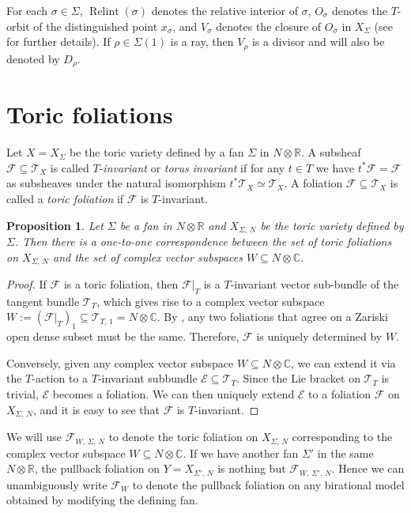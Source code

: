 \documentclass[12pt,reqno]{amsart}
\newtheorem{proposition}[theorem]{Proposition}
\theoremstyle{definition}
\newcommand{\mc}{\mathcal}
\newcommand{\on}{\operatorname}
\newcommand\cE{{\mathcal{E}}}
\newcommand\cF{{\mathcal{F}}}
\newcommand\cT{{\mathcal{T}}}
\newcommand\bC{{\mathbb C}}
\newcommand\bR{{\mathbb R}}
\begin{document}
For each $\sigma\in\Sigma$, $\on{Relint}(\sigma)$ denotes the relative interior of $\sigma$, $O_\sigma$ denotes the $T$-orbit of the distinguished point $x_\sigma$, and $V_\sigma$ denotes the closure of $O_\sigma$ in $X_\Sigma$ (see \cite[Chapter 3]{CLS11} for further details). 
If $\rho\in\Sigma(1)$ is a ray, then $V_\rho$ is a divisor and will also be denoted by $D_\rho$. 


\section{Toric foliations}\label{sec:toric_fol} 
Let $X=X_\Sigma$ be the toric variety defined by a fan $\Sigma$ in $N\otimes\bR$. 
A subsheaf $\cF\subseteq \cT_X$ is called $T$-\emph{invariant} or \emph{torus invariant} if for any $t\in T$ we have $t^*\mc F=\mc F$ as subsheaves under the natural isomorphism $t^*\cT_X\simeq \cT_X$. 
A foliation $\cF\subseteq \cT_X$ is called a \emph{toric foliation} if $\cF$ is $T$-invariant. 

\begin{proposition}\label{1-1}
Let $\Sigma$ be a fan in $N\otimes\bR$ and $X_{\Sigma,\,N}$ be the toric variety defined by $\Sigma$. 
Then there is a one-to-one correspondence between the set of toric foliations on $X_{\Sigma,\,N}$ and the set of complex vector subspaces $W\subseteq N\otimes\bC$. 
\end{proposition} 
\begin{proof}
    If $\cF$ is a toric foliation, then $\cF\vert_T$ is a $T$-invariant vector sub-bundle of the tangent bundle $\cT_T$, which gives rise to a complex vector subspace $W:=(\cF\vert_T)_{1}\subseteq \cT_{T,\,1}=N\otimes\bC$. 
    By \cite[Lemma 1.8]{hacon2021birational}, any two foliations that agree on a Zariski open dense subset must be the same.
    Therefore, $\cF$ is uniquely determined by $W$. 
    
    Conversely, given any complex vector subspace $W\subseteq N\otimes\bC$, we can extend it via the $T$-action to a $T$-invariant subbundle $\cE\subseteq \cT_T$. 
    Since the Lie bracket on $\cT_{T}$ is trivial, $\cE$ becomes a foliation.  
    We can then uniquely extend $\cE$ to a foliation $\cF$ on $X_{\Sigma,\,N}$, and it is easy to see that $\mc F$ is $T$-invariant. 
\end{proof}

We will use $\cF_{W,\,\Sigma,\,N}$ to denote the toric foliation on $X_{\Sigma,\,N}$ corresponding to the complex vector subspace $W\subseteq N\otimes\bC$. 
If we have another fan $\Sigma'$ in the same $N\otimes\bR$, the pullback foliation on $Y = X_{\Sigma',\,N}$ is nothing but $\cF_{W,\,\Sigma',\,N}$. Hence we can unambiguously write $\mc F_W$ to denote the pullback foliation on any birational model obtained by modifying the defining fan.   
 
\end{document}
